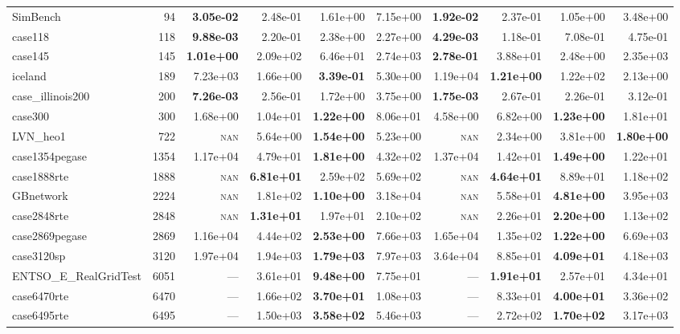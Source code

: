 \documentclass[10pt]{article}
\begin{document}
\begin{table}[H]
\begin{tabular}{lr rrrr rrrr}
SimBench & 94 & \textbf{3.05e-02} & 2.48e-01 & 1.61e+00 & 7.15e+00 & \textbf{1.92e-02} & 2.37e-01 & 1.05e+00 & 3.48e+00 \\
case118 & 118 & \textbf{9.88e-03} & 2.20e-01 & 2.38e+00 & 2.27e+00 & \textbf{4.29e-03} & 1.18e-01 & 7.08e-01 & 4.75e-01 \\
case145 & 145 & \textbf{1.01e+00} & 2.09e+02 & 6.46e+01 & 2.74e+03 & \textbf{2.78e-01} & 3.88e+01 & 2.48e+00 & 2.35e+03 \\
iceland & 189 & 7.23e+03 & 1.66e+00 & \textbf{3.39e-01} & 5.30e+00 & 1.19e+04 & \textbf{1.21e+00} & 1.22e+02 & 2.13e+00 \\
case\_illinois200 & 200 & \textbf{7.26e-03} & 2.56e-01 & 1.72e+00 & 3.75e+00 & \textbf{1.75e-03} & 2.67e-01 & 2.26e-01 & 3.12e-01 \\
case300 & 300 & 1.68e+00 & 1.04e+01 & \textbf{1.22e+00} & 8.06e+01 & 4.58e+00 & 6.82e+00 & \textbf{1.23e+00} & 1.81e+01 \\
LVN\_heo1 & 722 & \textsc{nan} & 5.64e+00 & \textbf{1.54e+00} & 5.23e+00 & \textsc{nan} & 2.34e+00 & 3.81e+00 & \textbf{1.80e+00} \\
case1354pegase & 1354 & 1.17e+04 & 4.79e+01 & \textbf{1.81e+00} & 4.32e+02 & 1.37e+04 & 1.42e+01 & \textbf{1.49e+00} & 1.22e+01 \\
case1888rte & 1888 & \textsc{nan} & \textbf{6.81e+01} & 2.59e+02 & 5.69e+02 & \textsc{nan} & \textbf{4.64e+01} & 8.89e+01 & 1.18e+02 \\
GBnetwork & 2224 & \textsc{nan} & 1.81e+02 & \textbf{1.10e+00} & 3.18e+04 & \textsc{nan} & 5.58e+01 & \textbf{4.81e+00} & 3.95e+03 \\
case2848rte & 2848 & \textsc{nan} & \textbf{1.31e+01} & 1.97e+01 & 2.10e+02 & \textsc{nan} & 2.26e+01 & \textbf{2.20e+00} & 1.13e+02 \\
case2869pegase & 2869 & 1.16e+04 & 4.44e+02 & \textbf{2.53e+00} & 7.66e+03 & 1.65e+04 & 1.35e+02 & \textbf{1.22e+00} & 6.69e+03 \\
case3120sp & 3120 & 1.97e+04 & 1.94e+03 & \textbf{1.79e+03} & 7.97e+03 & 3.64e+04 & 8.85e+01 & \textbf{4.09e+01} & 4.18e+03 \\
ENTSO\_E\_RealGridTest & 6051 & --- & 3.61e+01 & \textbf{9.48e+00} & 7.75e+01 & --- & \textbf{1.91e+01} & 2.57e+01 & 4.34e+01 \\
case6470rte & 6470 & --- & 1.66e+02 & \textbf{3.70e+01} & 1.08e+03 & --- & 8.33e+01 & \textbf{4.00e+01} & 3.36e+02 \\
case6495rte & 6495 & --- & 1.50e+03 & \textbf{3.58e+02} & 5.46e+03 & --- & 2.72e+02 & \textbf{1.70e+02} & 3.17e+03 \\

\end{tabular}
\end{table}
\end{document}

